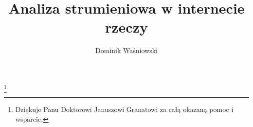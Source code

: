 \title{Analiza strumieniowa w internecie rzeczy}
\author{Dominik Waśniowski}
\thanks{Dziękuje Panu Doktorowi Januszowi Granatowi za całą okazaną pomoc i wsparcie.}
\maketitle
